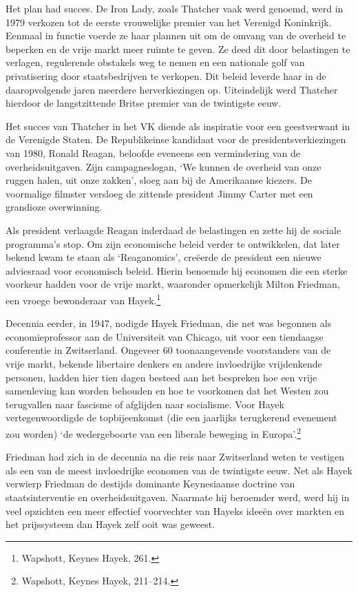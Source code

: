 \documentclass[smalldemyvopaper,11pt,twoside,onecolumn,openright,extrafontsizes,hidelinks]{memoir}
\begin{document}
Het plan had succes. De Iron Lady, zoals Thatcher vaak werd genoemd,
werd in 1979 verkozen tot de eerste vrouwelijke premier van het Verenigd
Koninkrijk. Eenmaal in functie voerde ze haar plannen uit om de omvang
van de overheid te beperken en de vrije markt meer ruimte te geven. Ze
deed dit door belastingen te verlagen, regulerende obstakels weg te
nemen en een nationale golf van privatisering door staatsbedrijven te
verkopen. Dit beleid leverde haar in de daaropvolgende jaren meerdere
herverkiezingen op. Uiteindelijk werd Thatcher hierdoor de
langstzittende Britse premier van de twintigste eeuw.

Het succes van Thatcher in het VK diende als inspiratie voor een
geestverwant in de Verenigde Staten. De Republikeinse kandidaat voor de
presidentsverkiezingen van 1980, Ronald Reagan, beloofde eveneens een
vermindering van de overheidsuitgaven. Zijn campagneslogan, `We kunnen
de overheid van onze ruggen halen, uit onze zakken', sloeg aan bij de
Amerikaanse kiezers. De voormalige filmster versloeg de zittende
president Jimmy Carter met een grandioze overwinning.

Als president verlaagde Reagan inderdaad de belastingen en zette hij de
sociale programma's stop. Om zijn economische beleid verder te
ontwikkelen, dat later bekend kwam te staan als `Reaganomics', creëerde
de president een nieuwe adviesraad voor economisch beleid. Hierin
benoemde hij economen die een sterke voorkeur hadden voor de vrije
markt, waaronder opmerkelijk Milton Friedman, een vroege bewonderaar van
Hayek.\footnote{Wapshott, Keynes Hayek, 261.}

Decennia eerder, in 1947, nodigde Hayek Friedman, die net was begonnen
als economieprofessor aan de Universiteit van Chicago, uit voor een
tiendaagse conferentie in Zwitserland. Ongeveer 60 toonaangevende
voorstanders van de vrije markt, bekende libertaire denkers en andere
invloedrijke vrijdenkende personen, hadden hier tien dagen besteed aan
het bespreken hoe een vrije samenleving kan worden behouden en hoe te
voorkomen dat het Westen zou terugvallen naar fascisme of afglijden naar
socialisme. Voor Hayek vertegenwoordigde de topbijeenkomst (die een
jaarlijks terugkerend evenement zou worden) `de wedergeboorte van een
liberale beweging in Europa'.\footnote{Wapshott, Keynes Hayek, 211--214.}

Friedman had zich in de decennia na die reis naar Zwitserland weten te
vestigen als een van de meest invloedrijke economen van de twintigste
eeuw. Net als Hayek verwierp Friedman de destijds dominante Keynesiaanse
doctrine van staatsinterventie en overheidsuitgaven. Naarmate hij
beroemder werd, werd hij in veel opzichten een meer effectief
voorvechter van Hayeks ideeën over markten en het prijssysteem dan Hayek
zelf ooit was geweest.
\end{document}
